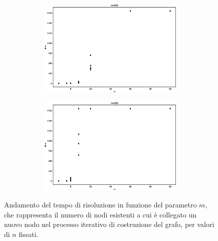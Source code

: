 \begin{figure}[h!]
\begin{subfigure}[b]{\textwidth}
\begin{subfigure}[b]{0.32\textwidth}
	         \includegraphics[width=\columnwidth]{images/bagm4.eps}
	     \end{subfigure}
	     \hspace{0em}
	      \begin{subfigure}[b]{0.32\textwidth}
	         \includegraphics[width=\columnwidth]{images/bagm5.eps}
	     \end{subfigure}
		\end{subfigure}
        \caption{Andamento del tempo di risoluzione in funzione del parametro $m$, che rappresenta il numero di nodi esistenti a cui è collegato un nuovo nodo nel processo iterativo di costruzione del grafo, per valori di $n$ fissati.}
        \label{fig:bagma}
\end{figure}



